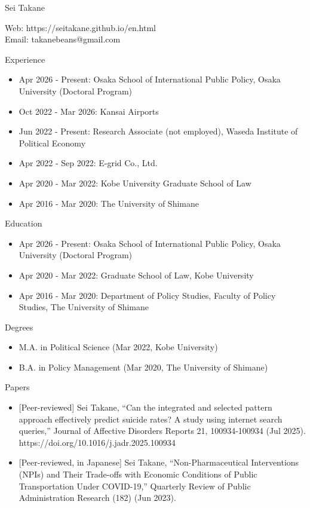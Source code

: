 \documentclass[12pt,a4paper]{article}
\begin{document}
\pagestyle{empty}
\noindent
{\Large Sei Takane}

\vspace{0.5em}
\noindent
Web: https://seitakane.github.io/en.html \\
Email: takanebeans@gmail.com

\vspace{1em}
{\large Experience}
\begin{itemize}
    \item Apr 2026 - Present: Osaka School of International Public Policy, Osaka University (Doctoral Program)
    \item Oct 2022 - Mar 2026: Kansai Airports
    \item Jun 2022 - Present: Research Associate (not employed), Waseda Institute of Political Economy
    \item Apr 2022 - Sep 2022: E-grid Co., Ltd.
    \item Apr 2020 - Mar 2022: Kobe University Graduate School of Law
    \item Apr 2016 - Mar 2020: The University of Shimane
\end{itemize}

\vspace{1em}
{\large Education}
\begin{itemize}
    \item Apr 2026 - Present: Osaka School of International Public Policy, Osaka University (Doctoral Program)
    \item Apr 2020 - Mar 2022: Graduate School of Law, Kobe University
    \item Apr 2016 - Mar 2020: Department of Policy Studies, Faculty of Policy Studies, The University of Shimane
\end{itemize}

\vspace{1em}
{\large Degrees}
\begin{itemize}
    \item M.A. in Political Science (Mar 2022, Kobe University)
    \item B.A. in Policy Management (Mar 2020, The University of Shimane)
\end{itemize}

\vspace{1em}
{\large Papers}
\begin{itemize}
    \item {[Peer-reviewed]} Sei Takane, ``Can the integrated and selected pattern approach effectively predict suicide rates? A study using internet search queries,'' Journal of Affective Disorders Reports 21, 100934-100934 (Jul 2025). https://doi.org/10.1016/j.jadr.2025.100934 
    \item {[Peer-reviewed, in Japanese]} Sei Takane, ``Non-Pharmaceutical Interventions (NPIs) and Their Trade-offs with Economic Conditions of Public Transportation Under COVID-19,'' Quarterly Review of Public Administration Research (182) (Jun 2023). 
\end{itemize}
\end{document}

